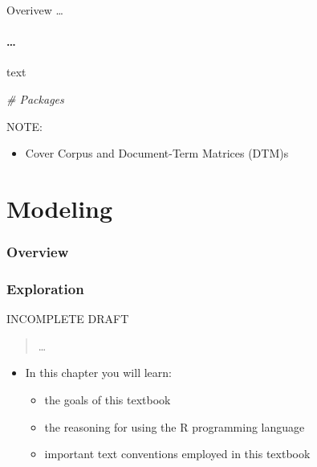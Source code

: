 \documentclass[
]{article}
\newenvironment{Shaded}{\begin{snugshade}}{\end{snugshade}}
\newcommand{\CommentTok}[1]{\textcolor[rgb]{0.56,0.35,0.01}{\textit{#1}}}
\providecommand{\tightlist}{%
  \setlength{\itemsep}{0pt}\setlength{\parskip}{0pt}}
\newenvironment{rmdblock}[1]
  {\begin{shaded*}
  \begin{itemize}
  \renewcommand{\labelitemi}{
    \raisebox{-.5\height}[0pt][0pt]{
      {\setkeys{Gin}{width=2em,keepaspectratio}\texttt{[image: assets/images/\#1]}}
    }
  }
  \item
  }
  {
  \end{itemize}
  \end{shaded*}
  }
\newenvironment{rmdkey}
  {\begin{rmdblock}{key}}
  {\end{rmdblock}}
\begin{document}
Overivew \ldots{}

\hypertarget{section-2}{%
\subsection{\ldots{}}\label{section-2}}

text

\begin{Shaded}
\begin{Highlighting}[]
\CommentTok{\# Packages}
\end{Highlighting}
\end{Shaded}

NOTE:

\begin{itemize}
\tightlist
\item
  Cover Corpus and Document-Term Matrices (DTM)s
\end{itemize}

\hypertarget{part-modeling}{%
\part{Modeling}\label{part-modeling}}

\hypertarget{modeling-overview}{%
\section*{Overview}\label{modeling-overview}}

\hypertarget{exploration}{%
\section{Exploration}\label{exploration}}

INCOMPLETE DRAFT

\begin{quote}
\ldots{}
\end{quote}

\begin{rmdkey}
In this chapter you will learn:

\begin{itemize}
\tightlist
\item
  the goals of this textbook
\item
  the reasoning for using the R programming language
\item
  important text conventions employed in this textbook
\end{itemize}
\end{rmdkey}
\end{document}
